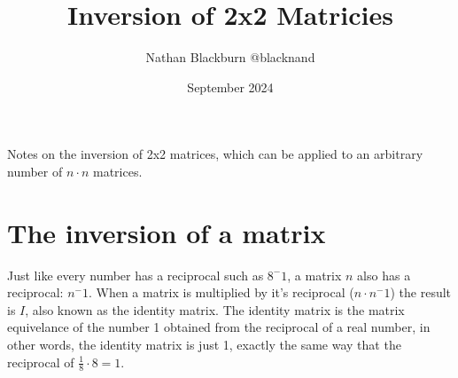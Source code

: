 \documentclass[options]{article}
\title{Inversion of 2x2 Matricies}
\author{Nathan Blackburn {@blacknand}}
\date{September 2024}
\begin{document}
\maketitle
Notes on the inversion of 2x2 matrices, which can be applied to an arbitrary number of \( n \cdot n \) matrices.
\vspace{-1em}
\section{The inversion of a matrix}
Just like every number has a reciprocal such as \(8^-1\), a matrix \(n\) also has a reciprocal: \(n^-1\). When a matrix
is multiplied by it's reciprocal (\(n \cdot n^-1\)) the result is \(I\), also known as the identity matrix. The identity matrix
is the matrix equivelance of the number 1 obtained from the reciprocal of a real number, in other words, the identity matrix is just 1, exactly the same
way that the reciprocal of \(\frac{1}{8} \cdot 8 = 1\).
\par
\end{document}
